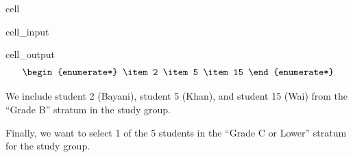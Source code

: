 \documentclass[letterpaper,10pt,english]{jupyterBook}
\begin{document}
\begin{sphinxuseclass}{cell}\begin{sphinxVerbatimInput}

\begin{sphinxuseclass}{cell_input}
\begin{sphinxVerbatim}[commandchars=\\\{\}]
\end{sphinxVerbatim}

\end{sphinxuseclass}\end{sphinxVerbatimInput}
\begin{sphinxVerbatimOutput}

\begin{sphinxuseclass}{cell_output}\begin{equation*}
\begin{split}\begin{enumerate*}
\item 2
\item 5
\item 15
\end{enumerate*}\end{split}
\end{equation*}
\end{sphinxuseclass}\end{sphinxVerbatimOutput}

\end{sphinxuseclass}
\sphinxAtStartPar
We include student 2 (Bayani), student 5 (Khan), and student 15 (Wai) from the “Grade B” stratum in the study group.

\sphinxAtStartPar
Finally, we want to select 1 of the 5 students in the “Grade C or Lower” stratum for the study group.
\end{document}
